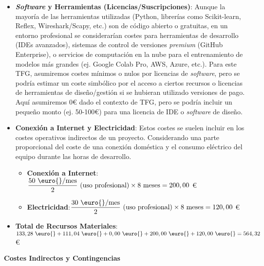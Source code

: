 \begin{itemize}
    \item\textbf{\textit{Software} y Herramientas (Licencias/Suscripciones)}:
    Aunque la mayoría de las herramientas utilizadas (Python, librerías como Scikit-learn, Reflex, Wireshark/Scapy, etc.) son de código abierto o gratuitas, en un entorno profesional se considerarían costes para herramientas de desarrollo (IDEs avanzados), sistemas de control de versiones \textit{premium} (GitHub Enterprise), o servicios de computación en la nube para el entrenamiento de modelos más grandes (ej. Google Colab Pro, AWS, Azure, etc.). Para este TFG, asumiremos costes mínimos o nulos por licencias de \textit{software}, pero se podría estimar un coste simbólico por el acceso a ciertos recursos o licencias de herramientas de diseño/gestión si se hubieran utilizado versiones de pago. Aquí asumiremos 0€ dado el contexto de TFG, pero se podría incluir un pequeño monto (ej. 50-100€) para una licencia de IDE o \textit{software} de diseño.
    
    \item\textbf{Conexión a Internet y Electricidad}:
    Estos costes se suelen incluir en los costes operativos indirectos de un proyecto. Considerando una parte proporcional del coste de una conexión doméstica y el consumo eléctrico del equipo durante las horas de desarrollo.
    
        \begin{itemize}
        
            \item\textbf{Conexión a Internet}:$\displaystyle \frac{50 \text{ \euro{}/mes}}{2} \text{ (uso profesional)} \times 8 \text{ meses} = 200,00 $ \euro{}
            
            \item\textbf{Electricidad}:$\displaystyle \frac{30 \text{ \euro{}/mes}}{2} \text{ (uso profesional)} \times 8 \text{ meses} = 120,00 $ \euro{}
                    
        \end{itemize}    
    
    \item\textbf{Total de Recursos Materiales}:$\displaystyle 133,28 \text{ \euro{}} + 111,04 \text{ \euro{}} + 0,00 \text{ \euro{}} + 200,00 \text{ \euro{}} + 120,00 \text{ \euro{}} = 564,32 $ \euro{}
   
\end{itemize}

\textbf{Costes Indirectos y Contingencias} 

